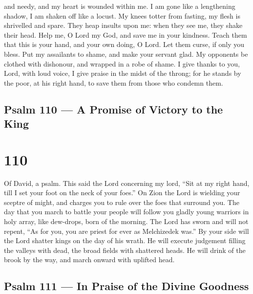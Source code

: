 and needy, and my heart is wounded within me.  I am gone
like a lengthening shadow, I am shaken off like a locust. 
My knees totter from fasting, my flesh is shrivelled and spare.
 They heap insults upon me: when they see me, they shake
their head.  Help me, O Lord my God, and save me in your
kindness.  Teach them that this is your hand, and your own
doing, O Lord.  Let them curse, if only you bless. Put my
assailants to shame, and make your servant glad.  My
opponents be clothed with dishonour, and wrapped in a robe of shame.
 I give thanks to you, Lord, with loud voice, I give praise
in the midst of the throng;  for he stands by the poor, at
his right hand, to save them from those who condemn them.

\hypertarget{psalm-110-a-promise-of-victory-to-the-king}{%
\subsection{Psalm 110 --- A Promise of Victory to the
King}\label{psalm-110-a-promise-of-victory-to-the-king}}

\hypertarget{section-109}{%
\section{110}\label{section-109}}

Of David, a psalm.  This said the Lord concerning my lord,
``Sit at my right hand, till I set your foot on the neck of your foes.''
 On Zion the Lord is wielding your sceptre of might, and
charges you to rule over the foes that surround you.  The
day that you march to battle your people will follow you gladly young
warriors in holy array, like dew-drops, born of the morning.
 The Lord has sworn and will not repent, ``As for you, you
are priest for ever as Melchizedek was.''  By your side will
the Lord shatter kings on the day of his wrath.  He will
execute judgement filling the valleys with dead, the broad fields with
shattered heads.  He will drink of the brook by the way, and
march onward with uplifted head.

\hypertarget{psalm-111-in-praise-of-the-divine-goodness}{%
\subsection{Psalm 111 --- In Praise of the Divine
Goodness}\label{psalm-111-in-praise-of-the-divine-goodness}}


